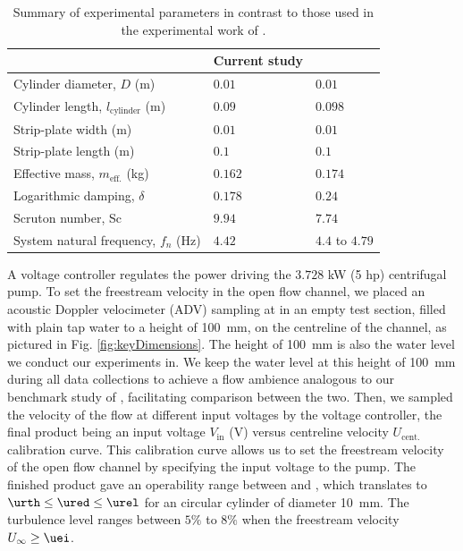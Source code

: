 \documentclass[a4paper,fleqn]{cas-sc}
\begin{document}
\begin{table}[width=0.9\linewidth,cols=3,pos=h]
  \caption{Summary of experimental parameters in contrast to those used in the experimental work of \citet{Koide2013}.} \label{tab:expParameter}
\begin{tabular*}{\tblwidth}{@{} LLL@{} }
\toprule
                                           & Current study & \citet{Koide2013}\\
\midrule
Cylinder diameter, $D$ (m)                 & $0.01$        & $0.01$           \\
Cylinder length, $l_{\text{cylinder}}$ (m) & $0.09$        & $0.098$          \\
Strip-plate width (m)                      & $0.01$        & $0.01$           \\
Strip-plate length (m)                     & $0.1$         & $0.1$            \\
Effective mass, $m_{\text{eff.}}$ (kg)     & $0.162$       & $0.174$          \\
Logarithmic damping, $\delta$              & $0.178$       & $0.24$           \\
Scruton number, Sc                         & $9.94$        & $7.74$           \\
System natural frequency, $f_{n}$ (Hz)     & $4.42$        & $4.4$ to $4.79$  \\
\bottomrule
\end{tabular*}
\end{table}

A voltage controller regulates the power driving the $3.728$ kW (5 hp) centrifugal pump. To set the freestream velocity in the open flow channel, we placed an acoustic Doppler velocimeter (ADV) sampling at in an empty test section, filled with plain tap water to a height of \SI{100}{\milli\metre}, on the centreline of the channel, as pictured in Fig. \ref{fig:keyDimensions}. The height of \SI{100}{\milli\metre} is also the water level we conduct our experiments in. We keep the water level at this height of \SI{100}{\milli\metre} during all data collections to achieve a flow ambience analogous to our benchmark study of \citet{Koide2013}, facilitating comparison between the two. Then, we sampled the velocity of the flow at different input voltages by the voltage controller, the final product being an input voltage $V_{\text{in}}$ (V) versus centreline velocity $U_{\text{cent.}}$ calibration curve. This calibration curve allows us to set the freestream velocity of the open flow channel by specifying the input voltage to the pump. The finished product gave an operability range between \uth{} and \uel{}, which translates to $\urth \leq \ured \leq \urel$ for an circular cylinder of diameter \SI{10}{\milli\metre}. The turbulence level ranges between $5\%$ to $8\%$ when the freestream velocity $U_{\infty} \geq \uei$.
\end{document}
